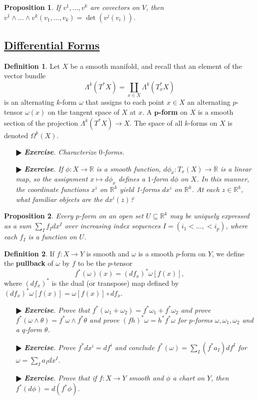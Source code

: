 \documentclass[11pt]{amsart}
\newtheorem*{proposition*}{Proposition}
\theoremstyle{definition}
\newtheorem*{definition*}{Definition}
\renewcommand\:{\colon}
\newcommand{\R}{\mathds{R}}
\newcommand{\1}{\mathds{1}}
\newcommand{\exc}[1]{\vspace{-2.5pt}\begin{itemize}[leftmargin=15pt]\item[$\RHD$] \textit{\textbf{Exercise}. #1}\end{itemize}}
\begin{document}
\begin{proposition*}
	If $v^1, \dots, v^k$ are covectors on $V$, then $v^1 \wedge \dots \wedge v^k(v_1, \dots, v_k) = \det( v^j(v_i) )$.
\end{proposition*}

\vskip20pt



\subsection*{\underline{Differential Forms}}

\begin{definition*}
	Let $X$ be a smooth manifold, and recall that an element of the vector bundle 
		\[ \Lambda^k(T^*X) = \coprod_{x \in X} \Lambda^k(T_x^*X) \]
	is an alternating $k$-form $\omega$ that assigns to each point $x \in X$ an alternating $p$-tensor $\omega(x)$ on the tangent space of $X$ at $x$. A \textbf{$\boldsymbol{p}$-form} on $X$ is a smooth section of the projection $\Lambda^k(T^*X) \to X$. The space of all $k$-forms on $X$ is denoted $\Omega^k(X)$.
\end{definition*}

\exc{Characterize $0$-forms.}
\exc{If $\phi\: X \to \R$ is a smooth function, $d\phi_x\: T_x(X) \to \R$ is a linear map, so the assignment $x \mapsto d\phi_x$ defines a $1$-form $d\phi$ on $X$. In this manner, the coordinate functions $x^i$ on $\R^k$ yield 1-forms $dx^i$ on $\R^k$. At each $z \in \R^k$, what familiar objects are the $dx^i(z)$?}

\begin{proposition*}
	Every $p$-form on an open set $U \subseteq \R^k$ may be uniquely expressed as a sum $\sum_I f_I dx^I$ over increasing index sequences $I = (i_1 < \dots, < i_p)$, where each $f_I$ is a function on $U$.
\end{proposition*}

\begin{definition*}
	If $f\: X \to Y$ is smooth and $\omega$ is a smooth $p$-form on $Y$, we define the \textbf{pullback} of $\omega$ by $f$ to be the $p$-tensor 
		\[ f^*(\omega)(x) = (df_x)^*\omega[f(x)], \]
	where $(df_x)^*$ is the dual (or transpose) map defined by $(df_x)^*\omega[f(x)] = \omega[f(x)] \circ df_x$.
\end{definition*}

\exc{Prove that $f^*(\omega_1 + \omega_2) = f^*\omega_1 + f^*\omega_2$ and prove $f^*(\omega \wedge \theta) = f^*\omega \wedge f^*\theta$ and prove $(fh)^*\omega = h^*f^*\omega$ for $p$-forms $\omega, \omega_1, \omega_2$ and a $q$-form $\theta$.}
\exc{Prove $f^*dx^i = df^i$ and conclude $f^*(\omega) = \sum_I (f^*a_I) df^I$ for $\omega = \sum_I a_I dx^I$.}
\exc{Prove that if $f\: X \to Y$ smooth and $\phi$ a chart on $Y$, then $f^*(d\phi) = d(f^* \phi)$.}
\end{document}
